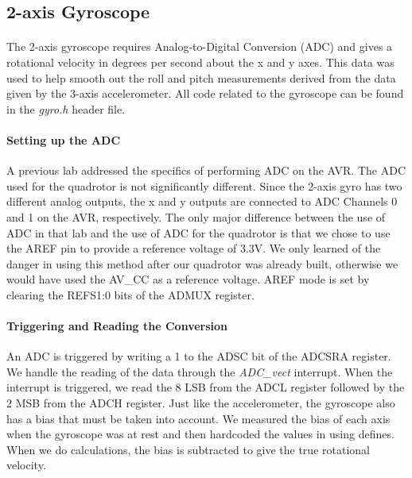 \subsection{2-axis Gyroscope}

\paragraph{}
The 2-axis gyroscope requires Analog-to-Digital Conversion (ADC) and gives a rotational velocity in degrees per second about the x and y axes.  This data was used to help smooth out the roll and pitch measurements derived from the data given by the 3-axis accelerometer.  All code related to the gyroscope can be found in the {\it gyro.h} header file.

\paragraph{Setting up the ADC}
A previous lab addressed the specifics of performing ADC on the AVR.  The ADC used for the quadrotor is not significantly different.  Since the 2-axis gyro has two different analog outputs, the  x and y outputs are connected to ADC Channels 0 and 1 on the AVR, respectively.  The only major difference between the use of ADC in that lab and the use of ADC for the quadrotor is that we chose to use the AREF pin to provide a reference voltage of 3.3V.  We only learned of the danger in using this method after our quadrotor was already built, otherwise we would have used the AV_{CC} as a reference voltage.  AREF mode is set by clearing the REFS1:0 bits of the ADMUX register.

\paragraph{Triggering and Reading the Conversion}
 An ADC is triggered by writing a 1 to the ADSC bit of the ADCSRA register.  We handle the reading of the data through the {\it ADC_vect} interrupt.  When the interrupt is triggered, we read the 8 LSB from the ADCL register followed by the 2 MSB from the ADCH register.  Just like the accelerometer, the gyroscope also has a bias that must be taken into account.  We measured the bias of each axis when the gyroscope was at rest and then hardcoded the values in using defines.  When we do calculations, the bias is subtracted to give the true rotational velocity.

